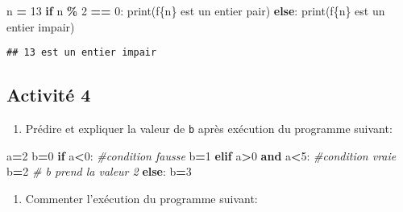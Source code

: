 \documentclass[
]{book}
\newenvironment{Shaded}{\begin{snugshade}}{\end{snugshade}}
\newcommand{\BuiltInTok}[1]{#1}
\newcommand{\CommentTok}[1]{\textcolor[rgb]{0.56,0.35,0.01}{\textit{#1}}}
\newcommand{\ControlFlowTok}[1]{\textcolor[rgb]{0.13,0.29,0.53}{\textbf{#1}}}
\newcommand{\DecValTok}[1]{\textcolor[rgb]{0.00,0.00,0.81}{#1}}
\newcommand{\KeywordTok}[1]{\textcolor[rgb]{0.13,0.29,0.53}{\textbf{#1}}}
\newcommand{\NormalTok}[1]{#1}
\newcommand{\OperatorTok}[1]{\textcolor[rgb]{0.81,0.36,0.00}{\textbf{#1}}}
\newcommand{\SpecialCharTok}[1]{\textcolor[rgb]{0.00,0.00,0.00}{#1}}
\newcommand{\SpecialStringTok}[1]{\textcolor[rgb]{0.31,0.60,0.02}{#1}}
\providecommand{\tightlist}{%
  \setlength{\itemsep}{0pt}\setlength{\parskip}{0pt}}
\def\tightlist{}
\begin{document}
\begin{Shaded}
\begin{Highlighting}[]
\NormalTok{n }\OperatorTok{=} \DecValTok{13}
\ControlFlowTok{if}\NormalTok{ n }\OperatorTok{\%} \DecValTok{2} \OperatorTok{==} \DecValTok{0}\NormalTok{:}
  \BuiltInTok{print}\NormalTok{(}\SpecialStringTok{f\textquotesingle{}}\SpecialCharTok{\{n\}}\SpecialStringTok{ est un entier pair\textquotesingle{}}\NormalTok{)}
\ControlFlowTok{else}\NormalTok{:}
  \BuiltInTok{print}\NormalTok{(}\SpecialStringTok{f\textquotesingle{}}\SpecialCharTok{\{n\}}\SpecialStringTok{ est un entier impair\textquotesingle{}}\NormalTok{)}
\end{Highlighting}
\end{Shaded}

\begin{verbatim}
## 13 est un entier impair
\end{verbatim}

\hypertarget{activituxe9-4}{%
\subsection{Activité 4}\label{activituxe9-4}}

\begin{enumerate}
\def\labelenumi{\arabic{enumi}.}
\tightlist
\item
  Prédire et expliquer la valeur de \texttt{b} après exécution du programme suivant:
\end{enumerate}

\begin{Shaded}
\begin{Highlighting}[]
\NormalTok{a}\OperatorTok{=}\DecValTok{2}
\NormalTok{b}\OperatorTok{=}\DecValTok{0}
\ControlFlowTok{if}\NormalTok{ a}\OperatorTok{\textless{}}\DecValTok{0}\NormalTok{: }\CommentTok{\#condition fausse}
\NormalTok{    b}\OperatorTok{=}\DecValTok{1}
\ControlFlowTok{elif}\NormalTok{ a}\OperatorTok{\textgreater{}}\DecValTok{0} \KeywordTok{and}\NormalTok{ a}\OperatorTok{\textless{}}\DecValTok{5}\NormalTok{: }\CommentTok{\#condition vraie}
\NormalTok{    b}\OperatorTok{=}\DecValTok{2} \CommentTok{\# b prend la valeur 2}
\ControlFlowTok{else}\NormalTok{:}
\NormalTok{    b}\OperatorTok{=}\DecValTok{3}
\end{Highlighting}
\end{Shaded}

\begin{enumerate}
\def\labelenumi{\arabic{enumi}.}
\setcounter{enumi}{1}
\tightlist
\item
  Commenter l'exécution du programme suivant:
\end{enumerate}
\end{document}

